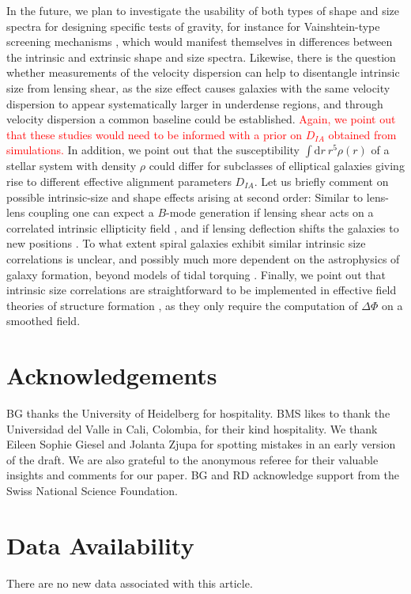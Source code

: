 \documentclass[a4paper,fleqn,usenatbib]{mnras}
\newcommand\foca[1]{\textcolor{red}{#1}}
\newcommand{\dd}{\mathrm{d}}
\begin{document}
In the future, we plan to investigate the usability of both types of shape and size spectra for designing specific tests of gravity, for instance for Vainshtein-type screening mechanisms \citep{kirk_optimising_2011, tessore_weak_2015}, which would manifest themselves in differences between the intrinsic and extrinsic shape and size spectra. Likewise, there is the question whether measurements of the velocity dispersion can help to disentangle intrinsic size from lensing shear, as the size effect causes galaxies with the same velocity dispersion to appear systematically larger in underdense regions, and through velocity dispersion a common baseline could be established. \foca{Again, we point out that these studies would need to be informed with a prior on $D_{IA}$ obtained from simulations.} In addition, we point out that the susceptibility $\int\dd r\:r^5\rho(r)$ of a stellar system with density $\rho$ could differ for subclasses of elliptical galaxies giving rise to different effective alignment parameters $D_{IA}$. Let us briefly comment on possible intrinsic-size and shape effects arising at second order: Similar to lens-lens coupling one can expect a $B$-mode generation if lensing shear acts on a correlated intrinsic ellipticity field \citep[similar to][]{cooray_second-order_2002}, and if lensing deflection shifts the galaxies to new positions \citep{giahi_evolution_2013, giahi-saravani_weak_2014}. To what extent spiral galaxies exhibit similar intrinsic size correlations is unclear, and possibly much more dependent on the astrophysics of galaxy formation, beyond models of tidal torquing \citep{schaefer_review:_2009}. Finally, we point out that intrinsic size correlations are straightforward to be implemented in effective field theories of structure formation \citep{fang_fast-pt_2017, vlah_eft_2019}, as they only require the computation of $\Delta\Phi$ on a smoothed field.


\section*{Acknowledgements}
BG thanks the University of Heidelberg for hospitality. BMS likes to thank the Universidad del Valle in Cali, Colombia, for their kind hospitality. We thank Eileen Sophie Giesel and Jolanta Zjupa for spotting mistakes in an early version of the draft. We are also grateful to the anonymous referee for their valuable insights and comments for our paper. BG and RD acknowledge support from the Swiss National Science Foundation.


\section*{Data Availability}
There are no new data associated with this article.




\bsp
\label{lastpage}
\end{document}
